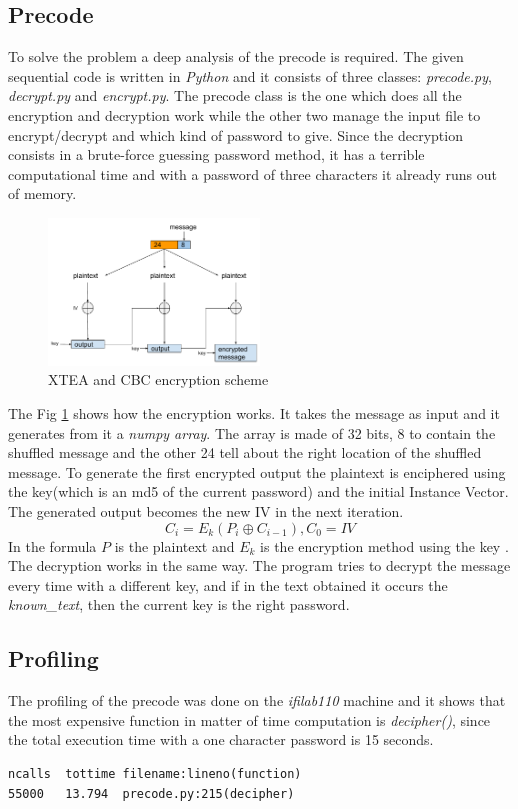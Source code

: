 \documentclass[11pt,conference]{IEEEtran}
\begin{document}
\subsection{Precode}
To solve the problem a deep analysis of the precode is required.
The given sequential code is written in \textit{Python} and it consists of three classes: \textit{precode.py}, \textit{decrypt.py} and \textit{encrypt.py}. The precode class is the one which does all the encryption and decryption work while the other two manage the input file to encrypt/decrypt and which kind of password to give. Since the decryption consists in a brute-force guessing password method, it has a terrible computational time and with a password of three characters it already runs out of memory.
\newline
\begin{figure}[h!]
  \centering
    \includegraphics[width=0.5\textwidth]{encryption}
    \caption{XTEA and CBC encryption scheme}
    \label{fig:encryption}
\end{figure}

The Fig \ref{fig:encryption} shows how the encryption works. It takes the message as input and it generates from it a \textit{numpy array}. The array is made of 32 bits, 8 to contain the shuffled message and the other 24 tell about the right location of the shuffled message. To generate the first encrypted output the plaintext is enciphered using the key(which is an md5 of the current password) and the initial Instance Vector. The generated output becomes the new IV in the next iteration.
\[
C_i = E_k(P_i \oplus C_{i-1}), C_0 = IV
\]
In the formula $P$ is the plaintext and $E_k$ is the encryption method using the key \cite{CBC}.
\newline
The decryption works in the same way. The program tries to decrypt the message every time with a different key, and if in the text obtained it occurs the \textit{known\_text}, then the current key is the right password.
\subsection{Profiling}
The profiling of the precode was done on the \textit{ifilab110} machine and it shows that the most expensive function in matter of time computation is \textit{decipher()}, since the total execution time with a one character password is 15 seconds.
\begin{lstlisting}
ncalls  tottime filename:lineno(function)
55000   13.794  precode.py:215(decipher)
\end{lstlisting}
\end{document}
